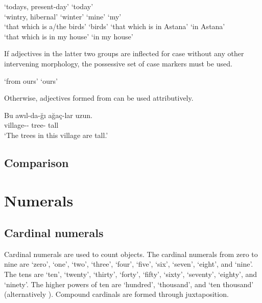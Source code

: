 \begin{exe}
	\ex \label{ex:gi-relational}  `today\apostrophe{}s, present-day' \derivedfrom{}  `today' \\
		 `wintry, hibernal' \derivedfrom{}  `winter'
	\ex \label{ex:gi-genitive}  `mine' \derivedfrom{}  `my' \\
		 `that which is a/the bird\apostrophe{}s' \derivedfrom{}  `bird\apostrophe{}s'
	\ex \label{ex:gi-locative}  `that which is in Astana' \derivedfrom{}  `in Astana' \\
		 `that which is in my house' \derivedfrom{}  `in my house'
\end{exe}

If adjectives in the latter two groups are inflected for case without any other intervening morphology, the possessive set of case markers must be used.

\begin{exe}
	\ex {} `from ours' \derivedfrom{}  `ours'
\end{exe}

Otherwise, adjectives formed from  can be used attributively.

\begin{lingexample}
	\ex \gll Bu awıl-da-ğı ağaç-lar uzun. \\
		\Prox{} village-\Loc{}-\Rel{} tree-\Pl{} tall \\
		`The trees in this village are tall.'
\end{lingexample}

\section{Comparison}

\chapter{Numerals}

\section{Cardinal numerals}

Cardinal numerals are used to count objects.
The cardinal numerals from zero to nine are  `zero',  `one',  `two',  `three',  `four',  `five',  `six',  `seven',  `eight', and  `nine'.
The tens are  `ten',  `twenty',  `thirty',  `forty',  `fifty',  `sixty',  `seventy',  `eighty', and  `ninety'.
The higher powers of ten are  `hundred',  `thousand', and  `ten thousand' (alternatively ).
Compound cardinals are formed through juxtaposition.

